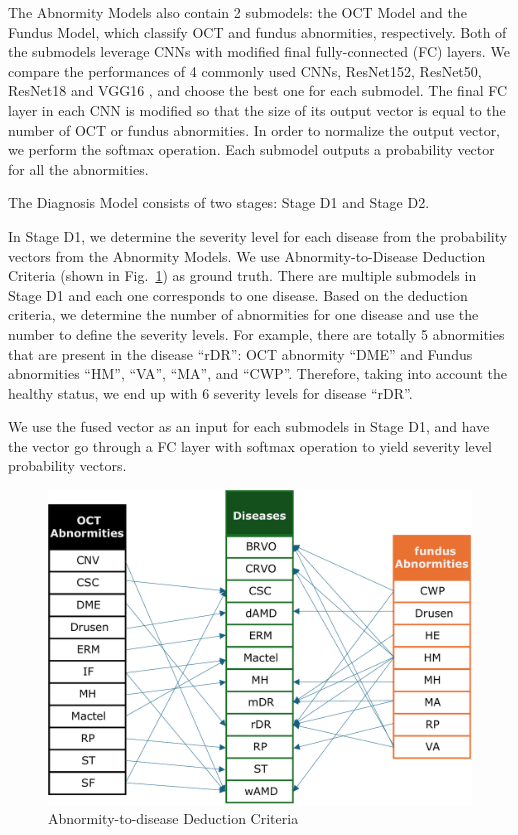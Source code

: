 \documentclass{article}
\begin{document}
	The Abnormity Models also contain 2 submodels: the OCT Model and the Fundus Model, which classify OCT and fundus abnormities, respectively. Both of the submodels leverage CNNs with modified final fully-connected (FC) layers. We compare the performances of 4 commonly used CNNs, ResNet152, ResNet50, ResNet18 \autocite{He_Zhang_Ren_Sun_2016} and VGG16 \autocite{Simonyan_Zisserman_2015}, and choose the best one for each submodel. The final FC layer in each CNN is modified so that the size of its output vector is equal to the number of OCT or fundus abnormities. In order to normalize the output vector, we perform the softmax operation. Each submodel outputs a probability vector for all the abnormities.
	
	\vspace{0.5cm}
	
	The Diagnosis Model consists of two stages: Stage D1 and Stage D2. 
	
	\vspace{0.2cm}
	
	In Stage D1, we determine the severity level for each disease from the probability vectors from the Abnormity Models. We use Abnormity-to-Disease Deduction Criteria (shown in Fig.~\ref{fig:criteria}) as ground truth. There are multiple submodels in Stage D1 and each one corresponds to one disease. Based on the deduction criteria, we determine the number of abnormities for one disease and use the number to define the severity levels. For example, there are totally 5 abnormities that are present in the disease ``rDR'': OCT abnormity ``DME'' and Fundus abnormities ``HM'', ``VA'', ``MA'', and ``CWP''. Therefore, taking into account the healthy status, we end up with 6 severity levels for disease ``rDR''.

	We use the fused vector as an input for each submodels in Stage D1, and have the vector go through a FC layer with softmax operation to yield severity level probability vectors.
	
	\begin{figure}[htbp]
		\centering
		\includegraphics[width=0.8\linewidth]{Figs/criteria.pdf}
		\caption{Abnormity-to-disease Deduction Criteria}
		\vspace{0.3cm}
		\label{fig:criteria}
	\end{figure}
\end{document}
